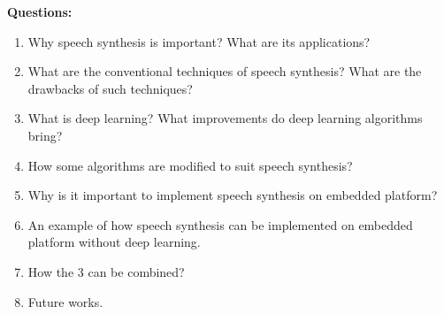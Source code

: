 \vspace{2em}
\textbf{\large Questions:}
\vspace{1em}
\begin{enumerate}[leftmargin=16pt]
	\item Why speech synthesis is important? What are its applications?
	\item What are the conventional techniques of speech synthesis? What are the drawbacks of such techniques?
	\item What is deep learning? What improvements do deep learning algorithms bring?
	\item How some algorithms are modified to suit speech synthesis?
	\item Why is it important to implement speech synthesis on embedded platform?
	\item An example of how speech synthesis can be implemented on embedded platform without deep learning.
	\item How the 3 can be combined?
	\item Future works.
\end{enumerate}

